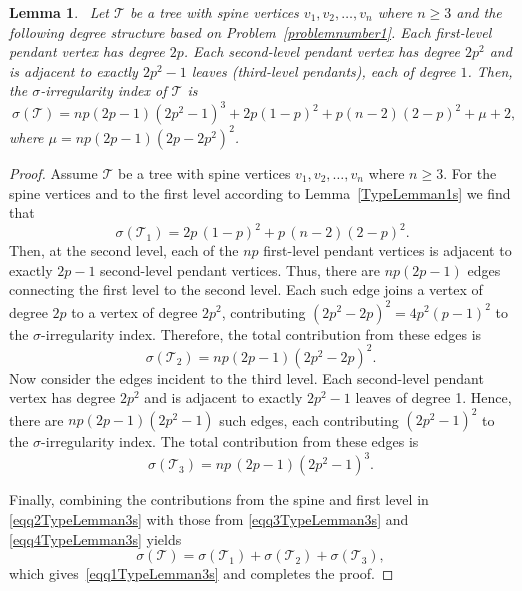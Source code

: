 \documentclass[12pt, a4paper]{article}
\theoremstyle{plain}  %
\newtheorem{lemma}[theorem]{Lemma}
\theoremstyle{definition}  %
\newcommand{\TT}{\mathcal{T}}
\begin{document}
\begin{lemma}~\label{TypeLemman3s}
Let $\TT$ be a tree with spine vertices $v_1,v_2,\dots,v_n$ where $n\geqslant 3$ and the following degree structure based on Problem~\ref{problemnumber1}. Each first-level pendant vertex has degree $2p$. Each second-level pendant vertex has degree $2p^2$ and is adjacent to exactly $2p^2-1$ leaves (third-level pendants), each of degree $1$. Then, the $\sigma$-irregularity index of $\TT$ is
\begin{equation}~\label{eqq1TypeLemman3s}
\sigma(\TT)=np(2p-1)(2p^2-1)^3+2p(1-p)^2+p(n-2)(2-p)^2+\mu+2,
\end{equation}
where $\mu=np(2p-1)(2p-2p^2)^2$.
\end{lemma}
\begin{proof}
Assume  $\TT$ be a tree with spine vertices $v_1,v_2,\dots,v_n$ where $n\geqslant 3$. For the spine vertices and to the first level according to Lemma~\ref{TypeLemman1s} we find that 
\begin{equation}~\label{eqq2TypeLemman3s}
\sigma(\TT_1)=2p\,(1-p)^2+p\,(n-2)(2-p)^2.
\end{equation}
Then, at the second level, each of the $np$ first-level pendant vertices is adjacent to exactly $2p-1$ second-level pendant vertices. Thus, there are $np(2p-1)$ edges connecting the first level to the second level. Each such edge joins a vertex of degree $2p$ to a vertex of degree $2p^2$, contributing $(2p^2 - 2p)^2 = 4p^2(p-1)^2$ to the $\sigma$-irregularity index. Therefore, the total contribution from these edges is
\begin{equation} \label{eqq3TypeLemman3s}
\sigma(\TT_2)=np(2p-1)(2p^2-2p)^2.
\end{equation}
Now consider the edges incident to the third level. Each second-level pendant vertex has degree $2p^2$ and is adjacent to exactly $2p^2-1$ leaves of degree 1. Hence, there are $np(2p-1)(2p^2-1)$ such edges, each contributing $(2p^2-1)^2$ to the $\sigma$-irregularity index. The total contribution from these edges is
\begin{equation} \label{eqq4TypeLemman3s}
\sigma(\TT_3)=np\,(2p-1)(2p^2-1)^3.
\end{equation}

Finally, combining the contributions from the spine and first level in \eqref{eqq2TypeLemman3s} with those from \eqref{eqq3TypeLemman3s} and \eqref{eqq4TypeLemman3s} yields
\[
\sigma(\TT)=\sigma(\TT_1)+\sigma(\TT_2)+\sigma(\TT_3),
\]
which gives~\eqref{eqq1TypeLemman3s} and completes the proof.
\end{proof}
\end{document}
